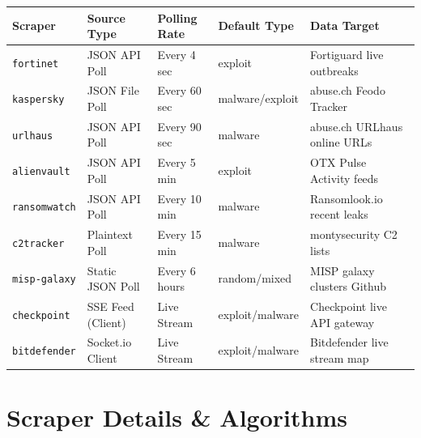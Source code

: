 \documentclass[11pt,a4paper]{report}
\begin{document}
\begin{longtable}{llllp{4.5cm}}
\toprule
\textbf{Scraper} & \textbf{Source Type} & \textbf{Polling Rate} & \textbf{Default Type} & \textbf{Data Target} \\
\midrule
\texttt{fortinet} & JSON API Poll & Every 4 sec & exploit & Fortiguard live outbreaks \\
\texttt{kaspersky} & JSON File Poll & Every 60 sec & malware/exploit & abuse.ch Feodo Tracker \\
\texttt{urlhaus} & JSON API Poll & Every 90 sec & malware & abuse.ch URLhaus online URLs \\
\texttt{alienvault} & JSON API Poll & Every 5 min & exploit & OTX Pulse Activity feeds \\
\texttt{ransomwatch} & JSON API Poll & Every 10 min & malware & Ransomlook.io recent leaks \\
\texttt{c2tracker} & Plaintext Poll & Every 15 min & malware & montysecurity C2 lists \\
\texttt{misp-galaxy} & Static JSON Poll & Every 6 hours & random/mixed & MISP galaxy clusters Github \\
\texttt{checkpoint} & SSE Feed (Client) & Live Stream & exploit/malware & Checkpoint live API gateway \\
\texttt{bitdefender} & Socket.io Client & Live Stream & exploit/malware & Bitdefender live stream map \\
\bottomrule
\end{longtable}

\section{Scraper Details \& Algorithms}
\end{document}
